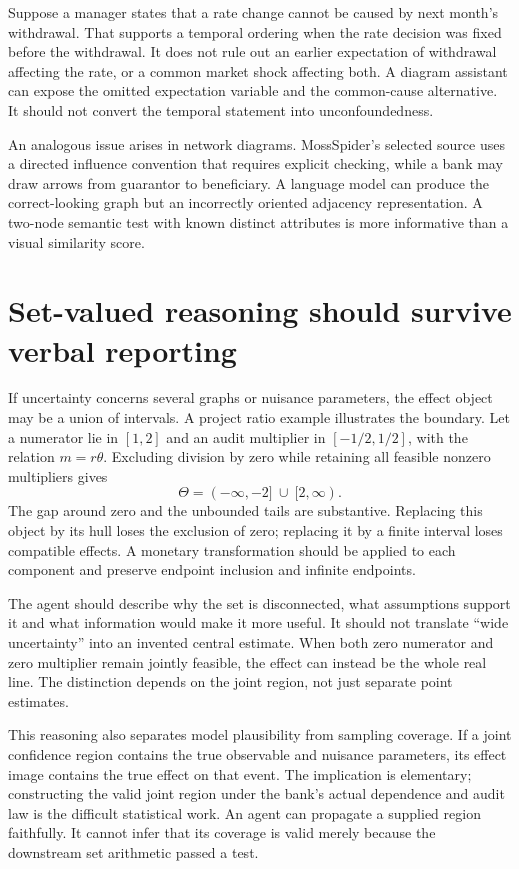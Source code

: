 Suppose a manager states that a rate change cannot be caused by next month's
withdrawal. That supports a temporal ordering when the rate decision was fixed
before the withdrawal. It does not rule out an earlier expectation of withdrawal
affecting the rate, or a common market shock affecting both. A diagram assistant
can expose the omitted expectation variable and the common-cause alternative.
It should not convert the temporal statement into unconfoundedness.

An analogous issue arises in network diagrams. MossSpider's selected source
uses a directed influence convention that requires explicit checking, while a
bank may draw arrows from guarantor to beneficiary. A language model can produce
the correct-looking graph but an incorrectly oriented adjacency representation.
A two-node semantic test with known distinct attributes is more informative
than a visual similarity score. \cite{v13_sw_mossspider}

\section{Set-valued reasoning should survive verbal reporting}

If uncertainty concerns several graphs or nuisance parameters, the effect
object may be a union of intervals. A project ratio example illustrates the
boundary. Let a numerator lie in $[1,2]$ and an audit multiplier in
$[-1/2,1/2]$, with the relation $m=r\theta$. Excluding division by zero while
retaining all feasible nonzero multipliers gives
\[
 \Theta=(-\infty,-2]\ \cup\ [2,\infty).
\]
The gap around zero and the unbounded tails are substantive. Replacing this
object by its hull loses the exclusion of zero; replacing it by a finite
interval loses compatible effects. A monetary transformation should be applied
to each component and preserve endpoint inclusion and infinite endpoints.

The agent should describe why the set is disconnected, what assumptions support
it and what information would make it more useful. It should not translate
``wide uncertainty'' into an invented central estimate. When both zero numerator
and zero multiplier remain jointly feasible, the effect can instead be the
whole real line. The distinction depends on the joint region, not just
separate point estimates.

This reasoning also separates model plausibility from sampling coverage. If a
joint confidence region contains the true observable and nuisance parameters,
its effect image contains the true effect on that event. The implication is
elementary; constructing the valid joint region under the bank's actual
dependence and audit law is the difficult statistical work. An agent can
propagate a supplied region faithfully. It cannot infer that its coverage is
valid merely because the downstream set arithmetic passed a test.


